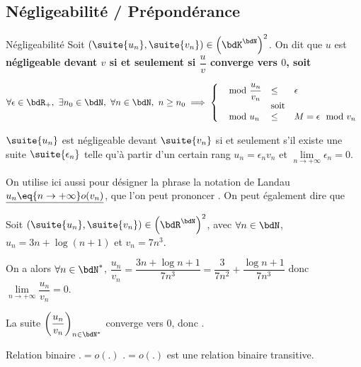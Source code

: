 \documentclass[a4paper,french,bookmarks]{article}
\begin{document}
\subsection{Négligeabilité / Prépondérance}
\begin{definition}{Négligeabilité}{}
    Soit $\left(\suite{u_n}, \suite{v_n}\right) \in \left(\bdK^\bdN\right)^2$. On dit que $u$ est \bf{négligeable} devant $v$ si et seulement si $\dfrac{u}{v}$ converge vers $0$, soit
    
    \[ \forall \epsilon \in \bdR_+,\ \exists n_0 \in \bdN, \ \forall n \in \bdN,\ n \geq n_0 \implies \left\lbrace\begin{array}{lll}
        \mod{\dfrac{u_n}{v_n}} &\leq& \epsilon \\
        &\text{soit}&\\
        \mod{u_n} &\leq& M=\epsilon \mod{v_n}
    \end{array}\right.\]
    
     $\suite{u_n}$ est négligeable devant $\suite{v_n}$ si et seulement s’il existe une suite $\suite{\epsilon_n}$ telle qu'à partir d'un certain rang $u_n = \epsilon_nv_n$ et $\lim\limits_{n \to +\infty} \epsilon_n = 0$.
\end{definition}

On utilise ici aussi pour désigner la phrase  la notation de Landau $\underline{u_n \eq{n \to +\infty} o(v_n)}$, que l'on peut prononcer . On peut également dire que 

\begin{example}{}{}
    Soit $\left(\suite{u_n}, \suite{v_n}\right) \in \left(\bdR^\bdN\right)^2$, avec $\forall n \in \bdN$, $u_n = 3n + \log (n+1)$ et $v_n = 7n^3$.
    
    On a alors $\forall n \in \bdN^*$, $\dfrac{u_n}{v_n} = \dfrac{3n+\log{n+1}}{7n^3} = \dfrac{3}{7n^2} + \dfrac{\log{n+1}}{7n^3}$ donc $\lim\limits_{n \to + \infty} \dfrac{u_n}{v_n} = 0$.
    
    La suite $\left(\dfrac{u_n}{v_n}\right)_{n \in \bdN^*}$ converge vers $0$, donc .
\end{example}

\begin{property}{Relation binaire $. = o(.)$}{}
    $. = o(.)$ est une relation binaire transitive.
\end{property}
\end{document}

